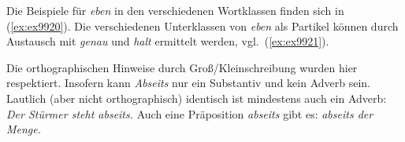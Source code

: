 
Die Beispiele für \textit{eben} in den verschiedenen Wortklassen finden sich in (\ref{ex:ex9920}).
Die verschiedenen Unterklassen von \textit{eben} als Partikel können durch Austausch mit \textit{genau} und \textit{halt} ermittelt werden, vgl.\ (\ref{ex:ex9921}).

\begin{exe}
  \ex \label{ex:ex9920}
  \begin{xlist}
  \end{xlist}
  \ex \label{ex:ex9921}
  \begin{xlist}
  \end{xlist}
\end{exe}


Die orthographischen Hinweise durch Groß/Kleinschreibung wurden hier respektiert.
Insofern kann \textit{Abseits} nur ein Substantiv und \zB kein Adverb sein.
Lautlich (aber nicht orthographisch) identisch ist mindestens auch ein Adverb: \textit{Der Stürmer steht abseits.}
Auch eine Präposition \textit{abseits} gibt es: \textit{abseits der Menge.}

